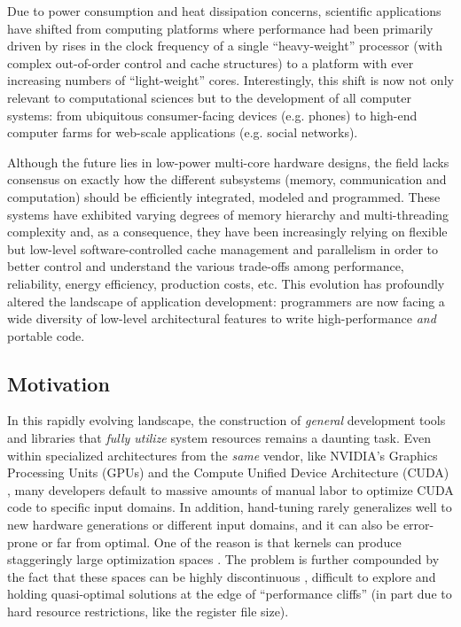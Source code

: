 \documentclass{sig-alternate}
\begin{document}
Due to power consumption and heat dissipation concerns, scientific applications
have shifted from computing platforms where performance had been primarily
driven by rises in the clock frequency of a single ``heavy-weight'' processor
(with complex out-of-order control and cache structures) to a platform with
ever increasing numbers of ``light-weight'' cores. Interestingly, this shift is
now not only relevant to computational sciences but to the development of all
computer systems: from ubiquitous consumer-facing devices (e.g. phones) to
high-end computer farms for web-scale applications (e.g. social networks).


Although the future lies in low-power multi-core hardware designs, the field
lacks  consensus on exactly how the different subsystems (memory,
communication and computation) should be efficiently integrated, modeled and
programmed. These systems have exhibited varying degrees of memory hierarchy
and multi-threading complexity and, as a consequence, they have been
increasingly relying on flexible but low-level software-controlled cache
management and parallelism \citep{asanovic2006landscape} in order to better
control and understand the various trade-offs among performance, reliability,
energy efficiency, production costs, etc. This evolution has profoundly
altered the landscape of application development: programmers are now
facing a wide diversity of low-level architectural features to write
high-performance \emph{and} portable code.

\subsection{Motivation}


In this rapidly evolving landscape, the construction of \emph{general}
development tools and libraries that \emph{fully utilize} system resources
remains a daunting task. Even within specialized architectures from the
\emph{same} vendor, like NVIDIA's Graphics Processing Units (GPUs) and the
Compute Unified Device Architecture (CUDA) \citep{nickolls2008scalable,
nvidia2011cuda}, many developers default to massive amounts of manual labor
to optimize CUDA code to specific input domains. In addition, hand-tuning
rarely generalizes well to new hardware generations or different input
domains, and it can also be error-prone or far from optimal. One of the
reason is that kernels can produce staggeringly large optimization spaces
\citep{datta2008stencil}. The problem is further compounded by the fact that
these spaces can be highly discontinuous \citep{ryoo2008program}, difficult
to explore and holding quasi-optimal solutions at the edge of ``performance
cliffs'' (in part due to hard resource restrictions, like the register file
size).
\end{document}

